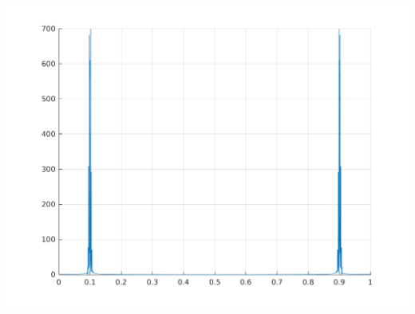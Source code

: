 \documentclass[a4paper]{article}
\begin{document}
\includegraphics[scale=0.7]{lab5/figures/figure_3.png}\\
\end{document}
